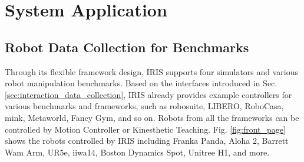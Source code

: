\section{System Application}

\subsection{Robot Data Collection for Benchmarks}

Through its flexible framework design, IRIS supports four simulators and various robot manipulation benchmarks.
Based on the interfaces introduced in Sec. \ref{sec:interaction_data_collection},
IRIS already provides example controllers for various benchmarks and frameworks, such as robosuite, LIBERO, RoboCasa, mink, Metaworld, Fancy Gym, and so on.
Robots from all the frameworks can be controlled by Motion Controller or Kinesthetic Teaching.
Fig. \ref{fig:front_page} shows the robots controlled by IRIS including Franka Panda, Aloha 2, Barrett Wam Arm, UR5e, iiwa14, Boston Dynamics Spot, Unitree H1, and more.



% 






